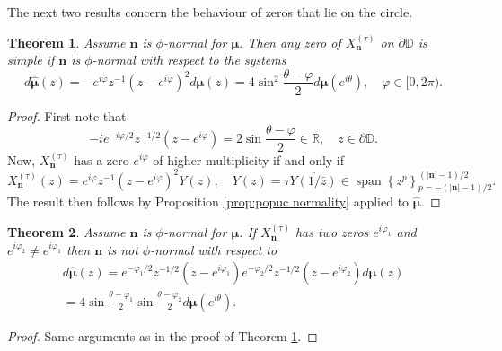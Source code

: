 \documentclass[reqno,centertags,11pt,draft]{amsart}
\newtheorem{thm}{Theorem}[section]
\newcommand{\R}{\mathbb{R}}
\newcommand{\D}{\mathbb{D}}
\renewcommand{\d}{\partial}
\newcommand{\abs}[1]{\left|#1\right|}
\newcommand{\set}[1]{\left\{#1\right\}}
\begin{document}
The next two results concern the behaviour of zeros that lie on the circle. 

\begin{thm}\label{thm:simple zeros on circle}
    Assume $\bm{n}$ is $\phi$-normal for $\bm{\mu}$. Then  any zero of $X_{\bm{n}}^{(\tau)}$ on $\d\D$ is simple if $\bm{n}$ is $\phi$-normal with respect to the systems 
    \begin{equation}
        d\widehat{\bm{\mu}}(z) = -e^{i\varphi}z^{-1}(z-e^{i\varphi})^2d\bm{\mu}(z) = 4\sin^2\frac{\theta-\varphi}{2}d\bm{\mu}(e^{i\theta}), \quad \varphi \in [0,2\pi).
    \end{equation}
\end{thm}

\begin{proof}
    First note that   \begin{equation}\label{eq:factorization 2}
    -ie^{-i\varphi/2}z^{-1/2}(z-e^{i\varphi}) = 2\sin\frac{\theta-\varphi}{2} \in \R, \quad z \in \d\D.
    \end{equation}
    Now,  $X_{\bm{n}}^{(\tau)}$ has a zero $e^{i\varphi}$ of higher multiplicity if and only if 
    \begin{equation}
        X_{\bm{n}}^{(\tau)}(z) = e^{i\varphi}z^{-1}(z-e^{i\varphi})^2Y(z), \quad Y(z) = \tau\overline{Y(1/\bar{z})} \in \operatorname{span}\set{z^p}_{p = -(\abs{\bm{n}}-1)/2}^{(\abs{\bm{n}}-1)/2}.
    \end{equation}
    The result then follows by Proposition \ref{prop:popuc normality} applied to $\widehat{\bm{\mu}}$.
\end{proof}

\begin{thm}\label{thm:two zeros the circle}
    Assume $\bm{n}$ is $\phi$-normal for $\bm{\mu}$. If $X_{\bm{n}}^{(\tau)}$ has two zeros $e^{i\varphi_1}$ and $e^{i\varphi_2} \neq e^{i\varphi_1}$ then $\bm{n}$ is not $\phi$-normal with respect to 
    \begin{multline}\label{eq:double christoffel transform on circle}
         d\widehat{\bm{\mu}}(z) = e^{-\varphi_1/2}z^{-1/2}(z-e^{i\varphi_1})e^{-\varphi_2/2}z^{-1/2}(z-e^{i\varphi_2})d\bm{\mu}(z) \\ = 4\sin\frac{\theta-\varphi_1}{2}\sin\frac{\theta-\varphi_2}{2}d\bm{\mu}(e^{i\theta}).
    \end{multline}
\end{thm}

\begin{proof}
    Same arguments as in the proof of Theorem \ref{thm:simple zeros on circle}.
\end{proof}
\end{document}
